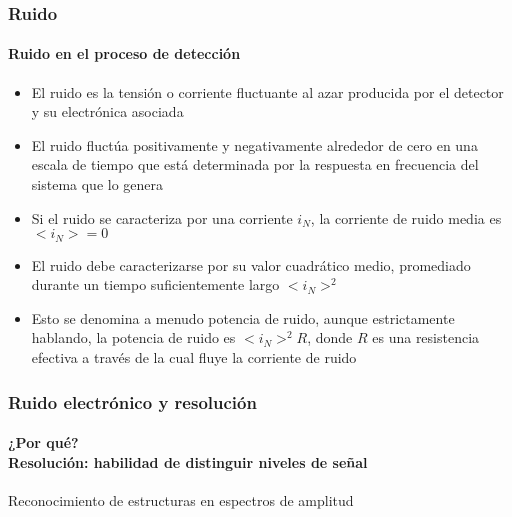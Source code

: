\documentclass{beamer}
\begin{document}
\begin{frame}
\frametitle{Ruido}
\framesubtitle{Ruido en el proceso de detección}
\begin{itemize}
\item El ruido es la \alert{tensión o corriente fluctuante al azar} producida por el
detector y su electrónica asociada
\item El ruido fluctúa positivamente y negativamente alrededor de cero en una
escala de tiempo que está determinada por la respuesta en frecuencia del sistema
que lo genera
\item Si el ruido se caracteriza por una corriente $i_N$, la corriente de ruido
media es $<\!i_N\!> = 0$
\item El ruido debe caracterizarse por su valor cuadrático medio, promediado
durante un tiempo suficientemente largo \alert{$<\!i_N\!>^2$}
\item Esto se denomina a menudo {\color{blue}potencia de ruido}, aunque estrictamente
hablando, la potencia de ruido es \alert{$<\!i_N\!>^2 R$}, donde $R$ es una
{\color{blue}resistencia efectiva} a través de la cual fluye la corriente de ruido
\end{itemize}
\end{frame} 


\begin{frame}
\frametitle{Ruido electrónico y resolución}
\framesubtitle{¿Por qué? \\ Resolución: habilidad de distinguir niveles de señal}
{\color{blue}Reconocimiento de estructuras en espectros de amplitud}
\begin{center}
\end{center}
\end{frame} 
\end{document}
